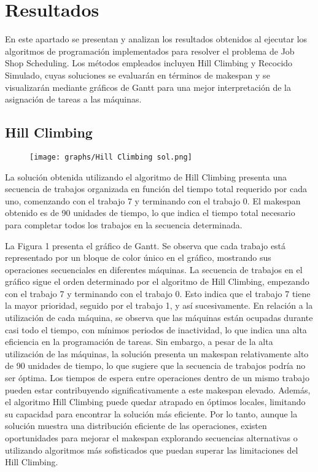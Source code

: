 \documentclass[11pt]{article}
\begin{document}
\section{Resultados}

En este apartado se presentan y analizan los resultados obtenidos al ejecutar los algoritmos de programación implementados para resolver el problema de Job Shop Scheduling. Los métodos empleados incluyen Hill Climbing y Recocido Simulado, cuyas soluciones se evaluarán en términos de makespan y se visualizarán mediante gráficos de Gantt para una mejor interpretación de la asignación de tareas a las máquinas.

\subsection{Hill Climbing}

\begin{figure}[H]
  \centering
  \texttt{[image: graphs/Hill Climbing sol.png]}
  \label{fig:miImagen}
\end{figure}

\noindent  La solución obtenida utilizando el algoritmo de Hill Climbing presenta una secuencia de trabajos organizada en función del tiempo total requerido por cada uno, comenzando con el trabajo 7 y terminando con el trabajo 0. El makespan obtenido es de 90 unidades de tiempo, lo que indica el tiempo total necesario para completar todos los trabajos en la secuencia determinada.

\vspace{1em} %
\noindent  La Figura 1 presenta el gráfico de Gantt. Se observa que cada trabajo está representado por un bloque de color único en el gráfico, mostrando sus operaciones secuenciales en diferentes máquinas. La secuencia de trabajos en el gráfico sigue el orden determinado por el algoritmo de Hill Climbing, empezando con el trabajo 7 y terminando con el trabajo 0. Esto indica que el trabajo 7 tiene la mayor prioridad, seguido por el trabajo 1, y así sucesivamente. En relación a la utilización de cada máquina, se observa que las máquinas están ocupadas durante casi todo el tiempo, con mínimos periodos de inactividad, lo que indica una alta eficiencia en la programación de tareas. Sin embargo, a pesar de la alta utilización de las máquinas, la solución presenta un makespan relativamente alto de 90 unidades de tiempo, lo que sugiere que la secuencia de trabajos podría no ser óptima. Los tiempos de espera entre operaciones dentro de un mismo trabajo pueden estar contribuyendo significativamente a este makespan elevado. Además, el algoritmo Hill Climbing puede quedar atrapado en óptimos locales, limitando su capacidad para encontrar la solución más eficiente. Por lo tanto, aunque la solución muestra una distribución eficiente de las operaciones, existen oportunidades para mejorar el makespan explorando secuencias alternativas o utilizando algoritmos más sofisticados que puedan superar las limitaciones del Hill Climbing.
\end{document}
